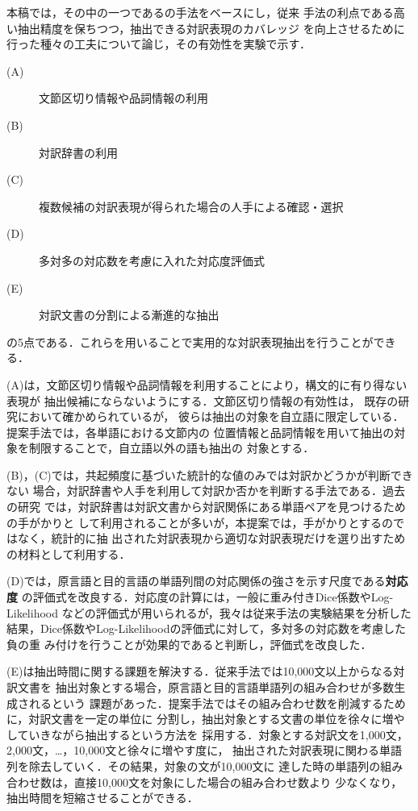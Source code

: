 本稿では，その中の一つである\cite{北村97}の手法をベースにし，従来
手法の利点である高い抽出精度を保ちつつ，抽出できる対訳表現のカバレッジ
を向上させるために行った種々の工夫について論じ，その有効性を実験で示す．

\begin{description}
\item[(A)] 文節区切り情報や品詞情報の利用 
\item[(B)] 対訳辞書の利用 
\item[(C)] 複数候補の対訳表現が得られた場合の人手による確認・選択 
\item[(D)] 多対多の対応数を考慮に入れた対応度評価式 
\item[(E)] 対訳文書の分割による漸進的な抽出
\end{description}

\noindent
の5点である．これらを用いることで実用的な対訳表現抽出を行うことができる．

(A)は，文節区切り情報や品詞情報を利用することにより，構文的に有り得ない表現が
抽出候補にならないようにする．文節区切り情報の有効性は，
既存の研究\cite{Yamamoto-Matsumoto:2003}において確かめられているが，
彼らは抽出の対象を自立語に限定している．提案手法では，各単語における文節内の
位置情報と品詞情報を用いて抽出の対象を制限することで，自立語以外の語も抽出の
対象とする．

(B)，(C)では，共起頻度に基づいた統計的な値のみでは対訳かどうかが判断できない
場合，対訳辞書や人手を利用して対訳か否かを判断する手法である．過去の研究\cite{佐藤2003}
では，対訳辞書は対訳文書から対訳関係にある単語ペアを見つけるための手がかりと
して利用されることが多いが，本提案では，手がかりとするのではなく，統計的に抽
出された対訳表現から適切な対訳表現だけを選り出すための材料として利用する．

(D)では，原言語と目的言語の単語列間の対応関係の強さを示す尺度である{\bf 対応度}
の評価式を改良する．対応度の計算には，一般に重み付きDice係数やLog-Likelihood
などの評価式が用いられるが，我々は従来手法\cite{北村97}の実験結果を分析した
結果，Dice係数やLog-Likelihoodの評価式に対して，多対多の対応数を考慮した負の重
み付けを行うことが効果的であると判断し，評価式を改良した．

(E)は抽出時間に関する課題を解決する．従来手法では10,000文以上からなる対訳文書を
抽出対象とする場合，原言語と目的言語単語列の組み合わせが多数生成されるという
課題があった．提案手法ではその組み合わせ数を削減するために，対訳文書を一定の単位に
分割し，抽出対象とする文書の単位を徐々に増やしていきながら抽出するという方法を
採用する．対象とする対訳文を1,000文，2,000文，…，10,000文と徐々に増やす度に，
抽出された対訳表現に関わる単語列を除去していく．その結果，対象の文が10,000文に
達した時の単語列の組み合わせ数は，直接10,000文を対象にした場合の組み合わせ数より
少なくなり，抽出時間を短縮させることができる．

